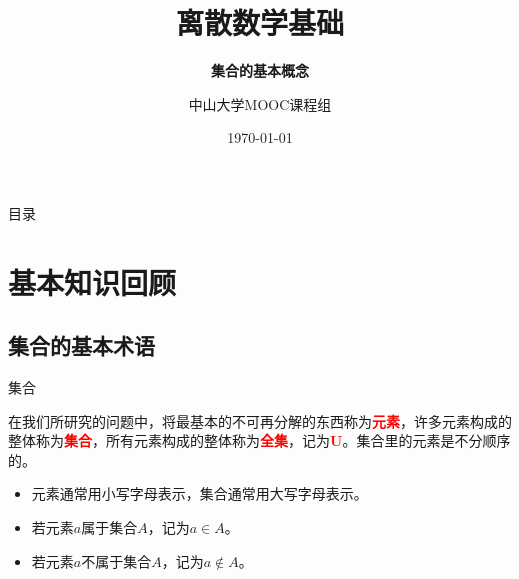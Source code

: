 \documentclass[xetex,10pt,aspectratio=43]{beamer}
\title{离散数学基础}
\subtitle{\fontsize{9pt}{14pt}\textbf{集合的基本概念}}
\author{中山大学MOOC课程组}
\institute{\fontsize{8pt}{14pt}中山大学计算机学院}
\date{\today}
\begin{document}
	
	\frame{\titlepage}
	
	\section[目录]{}   %
	\begin{frame}{目录}
		\tableofcontents
	\end{frame}

	\section{基本知识回顾}
	
	\subsection{集合的基本术语}
	
	\begin{frame}{集合}
		
		在我们所研究的问题中，将最基本的不可再分解的东西称为\textcolor{red}{\textbf{元素}}，许多元素构成的整体称为\textcolor{red}{\textbf{集合}}，所有元素构成的整体称为\textcolor{red}{\textbf{全集}}，记为\textcolor{red}{$\mathbf{U}$}。集合里的元素是不分顺序的。
		
		\begin{itemize}
			
			\item<1>元素通常用小写字母表示，集合通常用大写字母表示。
			
			\item<1>若元素$a$属于集合$A$，记为$a\in A$。
			
			\item<1>若元素$a$不属于集合$A$，记为$a\notin A$。
			
		\end{itemize}
		
	\end{frame}
\end{document}
